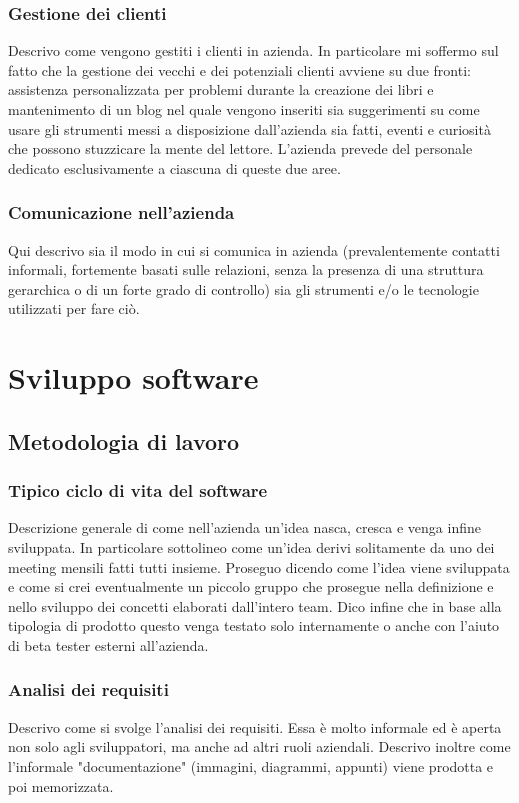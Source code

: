 			\subsubsection{Gestione dei clienti}
				Descrivo come vengono gestiti i clienti in azienda. In particolare mi soffermo sul fatto che la gestione dei vecchi
				e dei potenziali clienti avviene su due fronti: assistenza personalizzata per problemi durante la creazione dei libri
				e mantenimento di un blog nel quale vengono inseriti sia suggerimenti su come usare gli strumenti messi a
				disposizione dall'azienda sia fatti, eventi e curiosità che possono stuzzicare la mente del lettore. L'azienda
				prevede del personale dedicato esclusivamente a ciascuna di queste due aree.
			\subsubsection{Comunicazione nell'azienda}
				Qui descrivo sia il modo in cui si comunica in azienda (prevalentemente contatti informali, fortemente basati sulle
				relazioni, senza la presenza di una struttura gerarchica o di un forte grado di controllo) sia gli strumenti e/o le
				tecnologie utilizzati per fare ciò.
	\section{Sviluppo software}
		\subsection{Metodologia di lavoro}
			\subsubsection{Tipico ciclo di vita del software}
				Descrizione generale di come nell'azienda un'idea nasca, cresca e venga infine sviluppata. In particolare sottolineo
				come un'idea derivi solitamente da uno dei meeting mensili fatti tutti insieme. Proseguo dicendo come l'idea viene
				sviluppata e come si crei eventualmente un piccolo gruppo che prosegue nella definizione e nello sviluppo dei
				concetti elaborati dall'intero team. Dico infine che in base alla tipologia di prodotto questo venga testato solo
				internamente o anche con l'aiuto di beta tester esterni all'azienda.
			\subsubsection{Analisi dei requisiti}
				Descrivo come si svolge l'analisi dei requisiti. Essa è molto informale ed è aperta non solo agli sviluppatori, ma
				anche ad altri ruoli aziendali. Descrivo inoltre come l'informale "documentazione" (immagini, diagrammi, appunti)
				viene prodotta e poi memorizzata.
